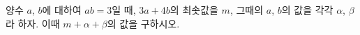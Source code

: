 양수 $a$, $b$에 대하여 $ab=3$일 때, $3a+4b$의 최솟값을 $m$, 그때의 $a$, $b$의 값을 각각 $\alpha$, $\beta$라 하자. 이때 $m+\alpha+\beta$의 값을 구하시오.
